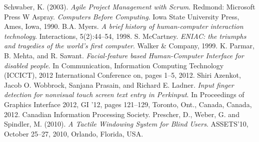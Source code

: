 \documentclass[a4paper,10pt]{article}
\begin{document}
\begin{thebibliography}{4}
 Schwaber, K. (2003). \emph{Agile Project Management with Scrum}. Redmond: Microsoft Press
 W Aspray. \emph{Computers Before Computing}. Iowa State University Press, Ames, Iowa, 1990.
B.A. Myers. \emph{A brief history of human-computer interaction technology}. Interactions, 5(2):44–54, 1998.
S. McCartney. \emph{ENIAC: the triumphs and tragedies of the world’s first computer}. Walker \& Company, 1999.
K. Parmar, B. Mehta, and R. Sawant. \emph{Facial-feature based Human-Computer Interface for disabled people}. In Communication, Information Computing Technology (ICCICT), 2012 International Conference on, pages 1–5, 2012.
Shiri Azenkot, Jacob O. Wobbrock, Sanjana Prasain, and Richard E. Ladner. \emph{Input finger detection
for nonvisual touch screen text entry in Perkinput}. In Proceedings of Graphics Interface 2012, GI ’12,
pages 121–129, Toronto, Ont., Canada, Canada, 2012. Canadian Information Processing Society.
Prescher, D., Weber, G. and Spindler, M. (2010). \emph{A Tactile Windowing System for Blind Users}. ASSETS’10, October 25–27, 2010, Orlando, Florida, USA.
\end{thebibliography}
\end{document}
